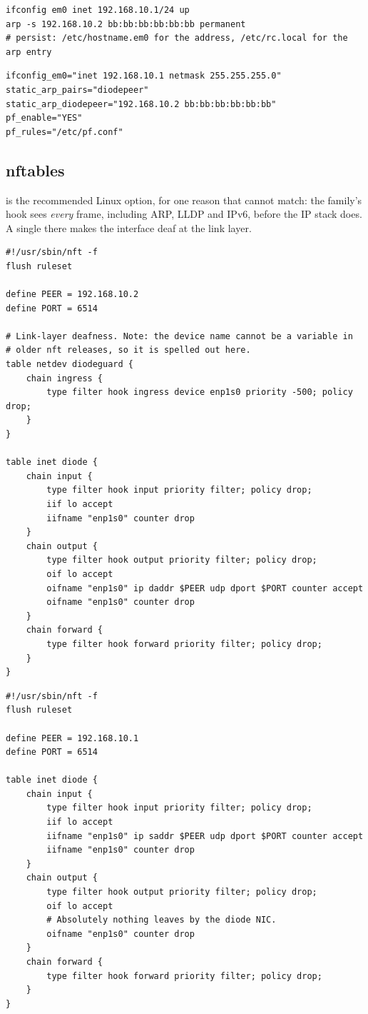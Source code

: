\documentclass[11pt,a4paper]{article}
\begin{document}
\begin{lstlisting}[style=shell,caption={OpenBSD}]
ifconfig em0 inet 192.168.10.1/24 up
arp -s 192.168.10.2 bb:bb:bb:bb:bb:bb permanent
# persist: /etc/hostname.em0 for the address, /etc/rc.local for the arp entry
\end{lstlisting}

\begin{lstlisting}[style=conf,caption={FreeBSD \file{/etc/rc.conf}}]
ifconfig_em0="inet 192.168.10.1 netmask 255.255.255.0"
static_arp_pairs="diodepeer"
static_arp_diodepeer="192.168.10.2 bb:bb:bb:bb:bb:bb"
pf_enable="YES"
pf_rules="/etc/pf.conf"
\end{lstlisting}

\subsection{nftables}

 is the recommended Linux option, for one reason that
 cannot match: the  family's  hook
sees \emph{every} frame, including ARP, LLDP and IPv6, before the IP stack
does. A single  there makes the interface deaf at the link
layer.

\begin{lstlisting}[style=nft,caption={\file{/etc/nftables.conf} --- SOURCE host (transmit only)}]
#!/usr/sbin/nft -f
flush ruleset

define PEER = 192.168.10.2
define PORT = 6514

# Link-layer deafness. Note: the device name cannot be a variable in
# older nft releases, so it is spelled out here.
table netdev diodeguard {
    chain ingress {
        type filter hook ingress device enp1s0 priority -500; policy drop;
    }
}

table inet diode {
    chain input {
        type filter hook input priority filter; policy drop;
        iif lo accept
        iifname "enp1s0" counter drop
    }
    chain output {
        type filter hook output priority filter; policy drop;
        oif lo accept
        oifname "enp1s0" ip daddr $PEER udp dport $PORT counter accept
        oifname "enp1s0" counter drop
    }
    chain forward {
        type filter hook forward priority filter; policy drop;
    }
}
\end{lstlisting}

\begin{lstlisting}[style=nft,caption={\file{/etc/nftables.conf} --- DESTINATION host (receive only)}]
#!/usr/sbin/nft -f
flush ruleset

define PEER = 192.168.10.1
define PORT = 6514

table inet diode {
    chain input {
        type filter hook input priority filter; policy drop;
        iif lo accept
        iifname "enp1s0" ip saddr $PEER udp dport $PORT counter accept
        iifname "enp1s0" counter drop
    }
    chain output {
        type filter hook output priority filter; policy drop;
        oif lo accept
        # Absolutely nothing leaves by the diode NIC.
        oifname "enp1s0" counter drop
    }
    chain forward {
        type filter hook forward priority filter; policy drop;
    }
}
\end{lstlisting}
\end{document}
